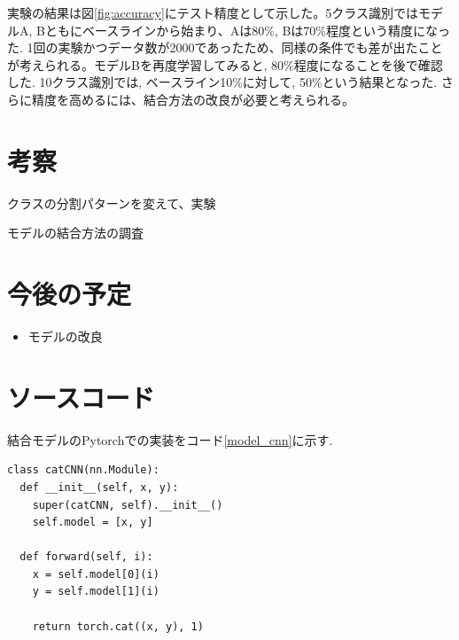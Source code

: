 \documentclass[twocolumn]{jarticle}     %
\begin{document}
実験の結果は図\ref{fig:accuracy}にテスト精度として示した。5クラス識別ではモデルA, Bともにベースラインから始まり、Aは80\%, Bは70\%程度という精度になった. 1回の実験かつデータ数が2000であったため、同様の条件でも差が出たことが考えられる。モデルBを再度学習してみると, 80\%程度になることを後で確認した.
10クラス識別では, ベースライン10\%に対して, 50\%という結果となった. さらに精度を高めるには、結合方法の改良が必要と考えられる。

\section{考察}
クラスの分割パターンを変えて、実験

モデルの結合方法の調査

\section{今後の予定}
\begin{itemize}
	\item {モデルの改良}
\end{itemize}


\section{ソースコード}

結合モデルのPytorchでの実装をコード\ref{model_cnn}に示す.

\begin{lstlisting}[caption=cnn,label=model_cnn]
class catCNN(nn.Module):
  def __init__(self, x, y):
    super(catCNN, self).__init__()
    self.model = [x, y]

  def forward(self, i):
    x = self.model[0](i)
    y = self.model[1](i)

    return torch.cat((x, y), 1)
\end{lstlisting}




\end{document}
